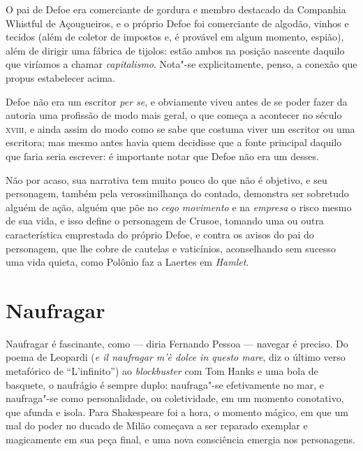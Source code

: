 O pai de Defoe era comerciante de gordura e membro destacado da
Companhia Whistful de Açougueiros, e o próprio Defoe foi comerciante de
algodão, vinhos e tecidos (além de coletor de impostos e, é provável em
algum momento, espião), além de dirigir uma fábrica de tijolos: estão
ambos na posição nascente daquilo que viríamos a chamar
\emph{capitalismo}. Nota"-se explicitamente, penso, a conexão que propus
estabelecer acima.

Defoe não era um escritor \emph{per se}, e obviamente viveu antes de se
poder fazer da autoria uma profissão de modo mais geral, o que começa a
acontecer no século \textsc{xviii}, e ainda assim do modo como se sabe que
costuma viver um escritor ou uma escritora; mas mesmo antes havia quem
decidisse que a fonte principal daquilo que faria seria escrever: é
importante notar que Defoe não era um desses.

Não por acaso, sua narrativa tem muito pouco do que não é objetivo, e
seu personagem, também pela verossimilhança do contado, demonstra ser
sobretudo alguém de ação, alguém que põe no \emph{cego movimento} e na
\emph{empresa} o risco mesmo de sua vida, e isso define o personagem de
Crusoe, tomando uma ou outra característica emprestada do próprio Defoe,
e contra os avisos do pai do personagem, que lhe cobre de cautelas e
vaticínios, aconselhando sem sucesso uma vida quieta, como Polônio faz a
Laertes em \emph{Hamlet}.

\section{Naufragar}

Naufragar é fascinante, como --- diria Fernando Pessoa --- navegar é
preciso. Do poema de Leopardi (\emph{e il naufragar m'è dolce in questo
mare}, diz o último verso metafórico de ``L'infinito'') ao
\emph{blockbuster} com Tom Hanks e uma bola de basquete, o naufrágio é
sempre duplo: naufraga"-se efetivamente no mar, e naufraga"-se como
personalidade, ou coletividade, em um momento conotativo, que afunda e
isola. Para Shakespeare foi a hora, o momento mágico, em que um mal do
poder no ducado de Milão começava a ser reparado exemplar e magicamente
em sua peça final, e uma nova consciência emergia nos personagens.

